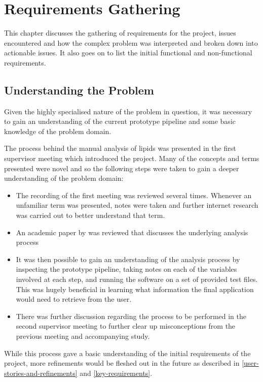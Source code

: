 \documentclass{l4proj}
\begin{document}
\chapter{Requirements Gathering}\label{requirements-gathering}
This chapter discusses the gathering of requirements for the project, issues encountered and how the complex problem was interpreted and broken down into actionable issues. It also goes on to list the initial functional and non-functional requirements.

\section{Understanding the Problem}
Given the highly specialised nature of the problem in question, it was necessary to gain an understanding of the current prototype pipeline and some basic knowledge of the problem domain.

The process behind the manual analysis of lipids was presented in the first supervisor meeting which introduced the project. Many of the concepts and terms presented were novel and so the following steps were taken to gain a deeper understanding of the problem domain:

\begin{itemize}
    \item The recording of the first meeting was reviewed several times. Whenever an unfamiliar term was presented, notes were taken and further internet research was carried out to better understand that term.
    \item An academic paper by \cite{goh} was reviewed that discusses the underlying analysis process
    \item It was then possible to gain an understanding of the analysis process by inspecting the prototype pipeline, taking notes on each of the variables involved at each step, and running the software on a set of provided test files. This was hugely beneficial in learning what information the final application would need to retrieve from the user.
    \item There was further discussion regarding the process to be performed in the second supervisor meeting to further clear up misconceptions from the previous meeting and accompanying study.
\end{itemize}

While this process gave a basic understanding of the initial requirements of the project, more refinements would be fleshed out in the future as described in \ref{user-stories-and-refinements} and \ref{key-requirements}.
\end{document}
